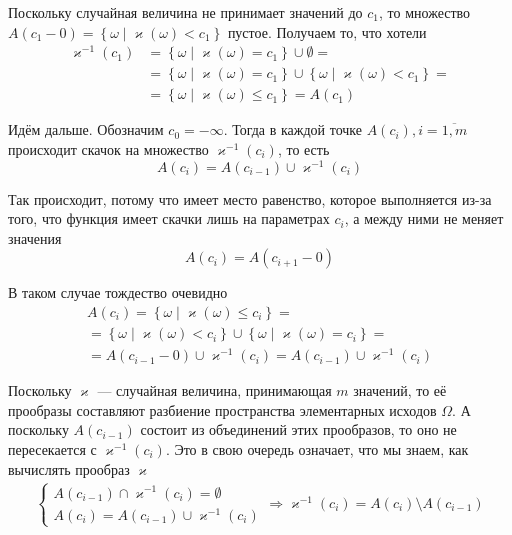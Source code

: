 Поскольку случайная величина не принимает значений до $c_1$,
то множество $A\left( c_1-0 \right)
=\left\{ \omega \mid \varkappa\left( \omega \right) < c_1 \right\}$ пустое.
Получаем то, что хотели
\begin{align*}
    \varkappa^{-1}\left( c_1 \right)
        &= \left\{ \omega \mid \varkappa\left( \omega \right) = c_1 \right\}
            \cup \emptyset = \\
        &= \left\{ \omega \mid \varkappa\left( \omega \right) = c_1 \right\}
            \cup \left\{ \omega
                \mid \varkappa\left( \omega \right) < c_1 \right\} = \\
        &= \left\{ \omega \mid \varkappa\left( \omega \right) \le c_1 \right\}
        = A\left( c_1 \right)
\end{align*}

Идём дальше. Обозначим $c_0 = -\infty$.
Тогда в каждой точке $A\left( c_i \right), i = \overline{1,m}$
происходит скачок на множество $\varkappa^{-1}\left( c_i \right)$, то есть 
$$A\left( c_i \right)
    = A\left( c_{i-1} \right) \cup \varkappa^{-1}\left( c_i \right)$$

Так происходит, потому что имеет место равенство,
которое выполняется из-за того,
что функция имеет скачки лишь на параметрах $c_i$,
а между ними не меняет значения
$$A\left( c_i \right) = A\left( c_{i+1} - 0 \right)$$

В таком случае тождество очевидно
\begin{align*}
A\left( c_i \right)
    = \left\{ \omega \mid \varkappa\left( \omega \right) \le c_i \right\} = \\
    = \left\{ \omega \mid \varkappa\left( \omega \right) < c_i \right\} \cup
        \left\{ \omega \mid \varkappa\left( \omega \right) = c_i \right\} = \\
    = A\left( c_{i-1}-0 \right) \cup \varkappa^{-1}\left( c_i \right)
    = A\left( c_{i-1} \right) \cup \varkappa^{-1}\left( c_i \right)
\end{align*}

Поскольку $\varkappa$ --- случайная величина, принимающая $m$ значений,
то её прообразы составляют разбиение пространства элементарных исходов $\Omega$.
А поскольку $A\left( c_{i-1} \right)$ состоит из объединений этих прообразов,
то оно не пересекается с $\varkappa^{-1}\left( c_i \right)$.
Это в свою очередь означает, что мы знаем, как вычислять прообраз $\varkappa$
\begin{align*}
    \begin{cases}
        A\left( c_{i-1} \right) \cap \varkappa^{-1}\left( c_i \right)
            = \emptyset \\
        A\left( c_i \right)
            = A\left( c_{i-1} \right) \cup \varkappa^{-1}\left( c_i \right)
    \end{cases}
    \Rightarrow \varkappa^{-1}\left( c_i \right) =
        A\left( c_{i} \right) \setminus A\left( c_{i-1} \right)
\end{align*}

